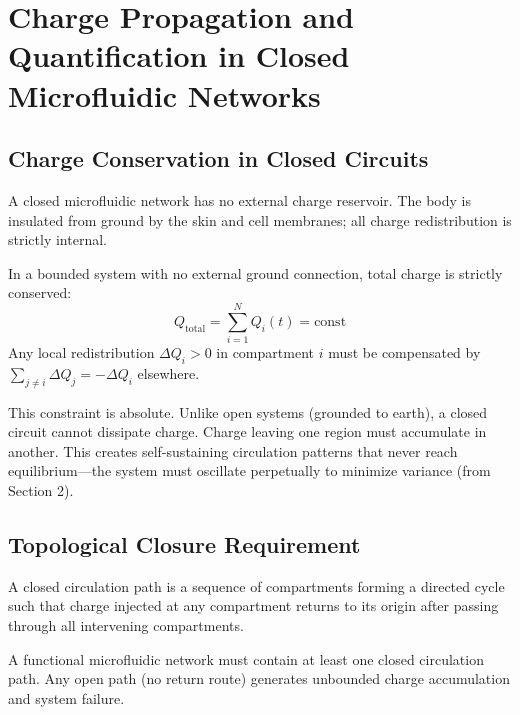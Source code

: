 \section{Charge Propagation and Quantification in Closed Microfluidic Networks}
\label{sec:charge-propagation}

\subsection{Charge Conservation in Closed Circuits}

A closed microfluidic network has no external charge reservoir. The body is insulated from ground by the skin and cell membranes; all charge redistribution is strictly internal.

\begin{theorem}
\label{thm:closed-conservation}
In a bounded system with no external ground connection, total charge is strictly conserved:
\begin{equation}
Q_{\text{total}} = \sum_{i=1}^{N} Q_i(t) = \text{const}
\end{equation}
Any local redistribution $\Delta Q_i > 0$ in compartment $i$ must be compensated by $\sum_{j \neq i} \Delta Q_j = -\Delta Q_i$ elsewhere.
\end{theorem}

This constraint is absolute. Unlike open systems (grounded to earth), a closed circuit cannot dissipate charge. Charge leaving one region must accumulate in another. This creates self-sustaining circulation patterns that never reach equilibrium—the system must oscillate perpetually to minimize variance (from Section 2).

\subsection{Topological Closure Requirement}

\begin{definition}
A closed circulation path is a sequence of compartments forming a directed cycle such that charge injected at any compartment returns to its origin after passing through all intervening compartments.
\end{definition}

\begin{theorem}
\label{thm:min-closure}
A functional microfluidic network must contain at least one closed circulation path. Any open path (no return route) generates unbounded charge accumulation and system failure.
\end{theorem}

